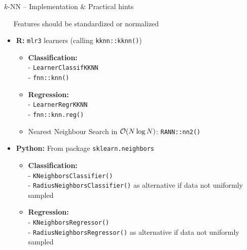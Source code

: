 \begin{frame}{$k$-NN -- Implementation \& Practical hints}

\footnotesize

 ~~
Features should be standardized or normalized

\medskip

\begin{itemize}
  \item \textbf{R:} \texttt{mlr3} learners (calling \texttt{kknn::kknn()})
  \begin{itemize}
    \item \textbf{Classification:}\\ 
    - \texttt{LearnerClassifKKNN}\\
    - \texttt{fnn::knn()}
    \item \textbf{Regression:}\\
    - \texttt{LearnerRegrKKNN}\\
    - \texttt{fnn::knn.reg()}
    \item Nearest Neighbour Search in $\mathcal{O}(N \log N)$: \texttt{RANN::nn2()}
  \end{itemize}
  \item \textbf{Python:} From package \texttt{sklearn.neighbors} 
  \begin{itemize}
    \item \textbf{Classification:}\\ 
    - \texttt{KNeighborsClassifier()}\\
    - \texttt{RadiusNeighborsClassifier()} as alternative if data not uniformly sampled
    \item \textbf{Regression:}\\
    - \texttt{KNeighborsRegressor()} \\
    - \texttt{RadiusNeighborsRegressor()} as alternative if data not uniformly sampled
  \end{itemize}
\end{itemize}

\end{frame}

